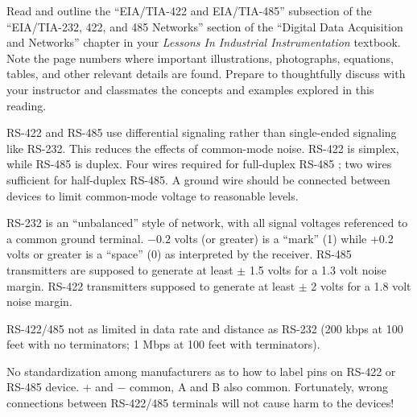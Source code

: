 

Read and outline the ``EIA/TIA-422 and EIA/TIA-485'' subsection of the ``EIA/TIA-232, 422, and 485 Networks'' section of the ``Digital Data Acquisition and Networks'' chapter in your {\it Lessons In Industrial Instrumentation} textbook.  Note the page numbers where important illustrations, photographs, equations, tables, and other relevant details are found.  Prepare to thoughtfully discuss with your instructor and classmates the concepts and examples explored in this reading.














RS-422 and RS-485 use differential signaling rather than single-ended signaling like RS-232.  This reduces the effects of common-mode noise.  RS-422 is simplex, while RS-485 is duplex.  Four wires required for full-duplex RS-485 ; two wires sufficient for half-duplex RS-485.  A ground wire should be connected between devices to limit common-mode voltage to reasonable levels.

\vskip 10pt

RS-232 is an ``unbalanced'' style of network, with all signal voltages referenced to a common ground terminal.  $-0.2$ volts (or greater) is a ``mark'' (1) while +0.2 volts or greater is a ``space'' (0) as interpreted by the receiver.  RS-485 transmitters are supposed to generate at least $\pm$ 1.5 volts for a 1.3 volt noise margin.  RS-422 transmitters supposed to generate at least $\pm$ 2 volts for a 1.8 volt noise margin.

\vskip 10pt

RS-422/485 not as limited in data rate and distance as RS-232 (200 kbps at 100 feet with no terminators; 1 Mbps at 100 feet with terminators).

\vskip 10pt

No standardization among manufacturers as to how to label pins on RS-422 or RS-485 device. + and $-$ common, A and B also common.  Fortunately, wrong connections between RS-422/485 terminals will not cause harm to the devices!

